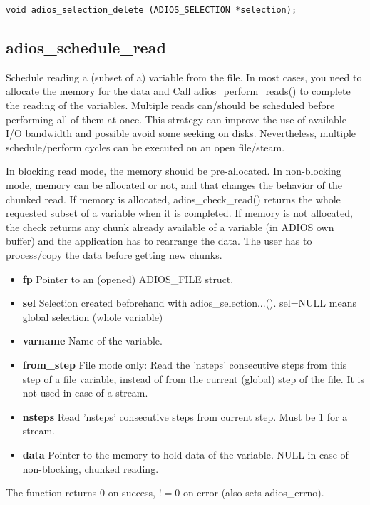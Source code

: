\begin{lstlisting}[alsolanguage=C]
void adios_selection_delete (ADIOS_SELECTION *selection);
\end{lstlisting}




\subsection{adios\_schedule\_read}
Schedule reading a (subset of a) variable from the file.
In most cases, you need to allocate the memory for the data and 
Call adios\_perform\_reads() to 
complete the reading of the variables. Multiple reads can/should be scheduled before performing 
all of them at once. This strategy can improve the use of available I/O bandwidth and possible avoid
some seeking on disks. Nevertheless, multiple schedule/perform cycles can be executed on an 
open file/steam.

In blocking read mode, the memory should be pre-allocated. 
In non-blocking mode, memory can be allocated or not, and that changes the behavior of the chunked read. 
If memory is allocated, adios\_check\_read() returns the whole requested subset of a variable when it is completed.
If memory is not allocated, the check returns any chunk already available of a variable (in ADIOS own buffer)
and the application has to rearrange the data. The user has to process/copy the data before getting new chunks.

\begin{itemize}
\item{\bf  fp}         Pointer to an (opened) ADIOS\_FILE struct.
\item{\bf  sel}        Selection created beforehand with adios\_selection...().
                 sel=NULL means global selection (whole variable)
\item{\bf  varname}    Name of the variable.
\item{\bf  from\_step}  File mode only: Read the 'nsteps' consecutive steps from this 
step of a file variable, instead of from the current (global) step of the file. It is not used in case of a stream.
\item{\bf nsteps}     Read 'nsteps' consecutive steps from current step. Must be 1 for a stream. 
\item{\bf data} Pointer to the memory to hold data of the variable. NULL in case of non-blocking, chunked reading.
\end{itemize}

The function returns 0 on success, $!=0$ on error (also sets adios\_errno).


